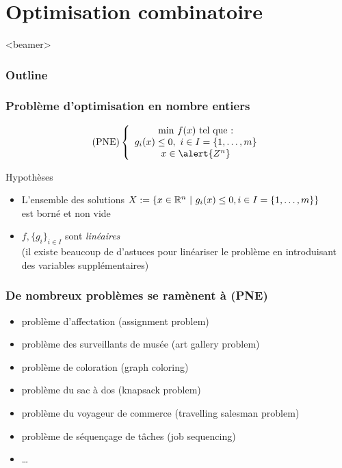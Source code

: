 \documentclass{beamer}
\newcommand{\R}{{\ensuremath\mathbb{R}}}
\begin{document}

\section{Optimisation combinatoire}

\begin{frame}<beamer>
  \frametitle{Outline}
  \tableofcontents[currentsection]
\end{frame}

\begin{frame}
  \frametitle{Problème d'optimisation en nombre entiers}
  
  \[
  \text{(PNE)} \left\{
  \begin{array}{c}
    \text{min} \ f(x) \ \text{tel que :} \\
    g_i(x) \leq 0, \ i \in I = \{1, \dots, m\} \\
    x \in \alert{Z^n}
  \end{array}
  \right.
  \]

  \begin{block}{Hypothèses}
    \begin{itemize}
    \item L'ensemble des solutions $X := \{ x \in \R^n \ | \ g_i(x) \leq 0, i \in I = \{1, \dots, m\} \}$ \\
      est borné et non vide
    \item $f, \{g_i\}_{i \in I}$ sont \emph{linéaires} \\
      (il existe beaucoup de d'astuces pour
      linéariser le problème en introduisant des variables supplémentaires)
    \end{itemize}
  \end{block}
\end{frame}

\begin{frame}
  \frametitle{De nombreux problèmes se ramènent à (PNE)}

  \begin{itemize}
    \item problème d'affectation (assignment problem)
    \item problème des surveillants de musée (art gallery problem)
    \item problème de coloration (graph coloring)
    \item problème du sac à dos (knapsack problem)
    \item problème du voyageur de commerce (travelling salesman problem)
    \item problème de séquençage de tâches (job sequencing)
    \item \dots
  \end{itemize}
  
\end{frame}
\end{document}
